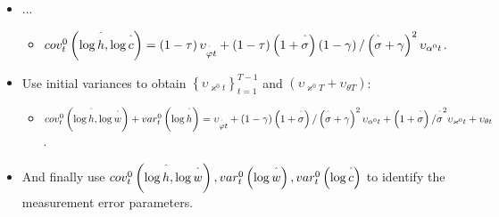 \documentclass[notes=show]{beamer}
\begin{document}
\bigskip

\begin{frame}%



\begin{itemize}
\item ...

\begin{itemize}
\item $cov_{t}^{0}\left( \log \overset{\symbol{94}}{h},\log \overset{\symbol{%
94}}{c}\right) =\left( 1-\tau \right) \upsilon _{\overset{\symbol{94}}{%
\varphi }t}+\left( 1-\tau \right) \left( 1+\overset{\symbol{94}}{\sigma }%
\right) \left( 1-\gamma \right) /\left( \overset{\symbol{94}}{\sigma }%
+\gamma \right) ^{2}\upsilon _{\alpha ^{0}t}$.
\end{itemize}

\item Use initial variances to obtain $\left\{ \upsilon _{\varkappa
^{0}t}\right\} _{t=1}^{T-1}$ and $\left( \upsilon _{\varkappa
^{0}T}+\upsilon _{\theta T}\right) $:

\begin{itemize}
\item $cov_{t}^{0}\left( \log \overset{\symbol{94}}{h},\log \overset{\symbol{%
94}}{w}\right) +var_{t}^{0}\left( \log \overset{\symbol{94}}{h}\right)
=\upsilon _{\overset{\symbol{94}}{\varphi }t}+\left( 1-\gamma \right) \left(
1+\overset{\symbol{94}}{\sigma }\right) /\left( \overset{\symbol{94}}{\sigma 
}+\gamma \right) ^{2}\upsilon _{\alpha ^{0}t}+\left( 1+\overset{\symbol{94}}{%
\sigma }\right) /\overset{\symbol{94}}{\sigma }^{2}\upsilon _{\varkappa
^{0}t}+\upsilon _{\theta t}$.
\end{itemize}

\item And finally use $cov_{t}^{0}\left( \log \overset{\symbol{94}}{h},\log 
\overset{\symbol{94}}{w}\right) ,var_{t}^{0}\left( \log \overset{\symbol{94}}%
{w}\right) ,var_{t}^{0}\left( \log \overset{\symbol{94}}{c}\right) $ to
identify the measurement error parameters.
\end{itemize}

\transboxout%
\end{frame}%
\end{document}
